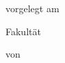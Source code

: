 \thispagestyle{empty}

\begin{spacing}{1}
    \begin{center}
        \vspace{0mm}

        {\sffamily
            \LARGE
            \textbf{\themaMeinerArbeit}

            \bigskip
            \textbf{\unterThemaMeinerArbeit}
        }

        \vspace{15mm}

        {\Large \typMeinerArbeit}

        \vspace{1cm}

        vorgelegt am  \duedate{}

        \vspace{15mm}

        Fakultät \faculty{}
        \medskip

        \specialisation{}
        \medskip

        \course{}

        \vspace{10mm}

        von

        \vspace{10mm}

        {\large\textsc{\meinName}}

        \vspace{5mm}
    \end{center}

    \vfill




    \begin{tabular}{l}  %
    \end{tabular}


\end{spacing}

